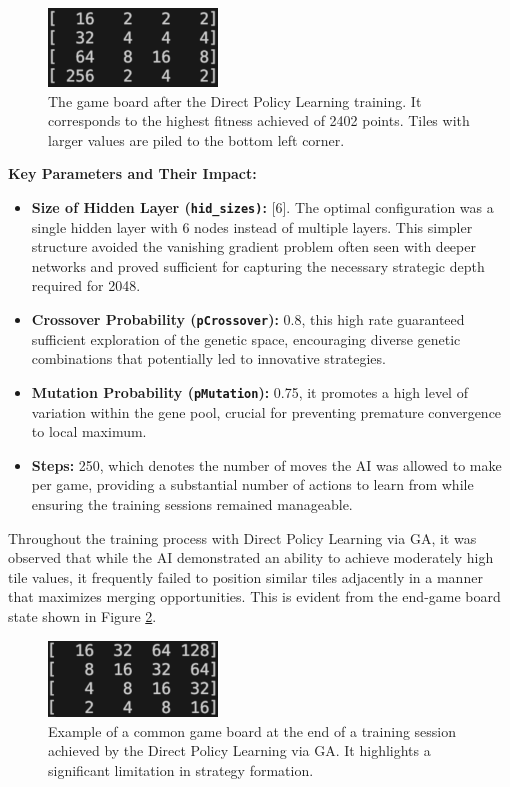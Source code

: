 \documentclass[11pt]{article}
\begin{document}
\FloatBarrier

\begin{figure}[ht]
\centering
\includegraphics[width=0.4\textwidth]{2402board.png}
\caption{The game board after the Direct Policy Learning training. It corresponds to the highest fitness achieved of 2402 points. Tiles with larger values are piled to the bottom left corner.}
\label{fig:2402endgame}
\end{figure}

\textbf{Key Parameters and Their Impact:}
\begin{itemize}
    \item \textbf{Size of Hidden Layer (\texttt{hid\_sizes)}:} [6]. The optimal configuration was a single hidden layer with 6 nodes instead of multiple layers. This simpler structure avoided the vanishing gradient problem often seen with deeper networks and proved sufficient for capturing the necessary strategic depth required for 2048.
    \item \textbf{Crossover Probability (\texttt{pCrossover}):} 0.8, this high rate guaranteed sufficient exploration of the genetic space, encouraging diverse genetic combinations that potentially led to innovative strategies.
    \item \textbf{Mutation Probability (\texttt{pMutation}):} 0.75, it promotes a high level of variation within the gene pool, crucial for preventing premature convergence to local maximum.
    \item \textbf{Steps:} 250, which denotes the number of moves the AI was allowed to make per game, providing a substantial number of actions to learn from while ensuring the training sessions remained manageable.
\end{itemize}

Throughout the training process with Direct Policy Learning via GA, it was observed that while the AI demonstrated an ability to achieve moderately high tile values, it frequently failed to position similar tiles adjacently in a manner that maximizes merging opportunities. This is evident from the end-game board state shown in Figure \ref{fig:endgame}. 

\begin{figure}[ht]
\centering
\includegraphics[width=0.4\textwidth]{figure3.png}
\caption{Example of a common game board at the end of a training session achieved by the Direct Policy Learning via GA. It highlights a significant limitation in strategy formation.}
\label{fig:endgame}
\end{figure}
\end{document}

